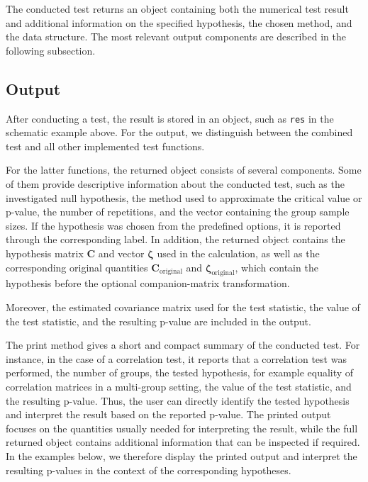 The conducted test returns an object containing both the numerical test result
and additional information on the specified hypothesis, the chosen method, and
the data structure. The most relevant output components are described in the
following subsection.

\subsection{Output}\label{output}

After conducting a test, the result is stored in an object, such as \texttt{res} in
the schematic example above. For the output, we distinguish between the
combined test and all other implemented test functions.

For the latter functions, the returned object consists of several components.
Some of them provide descriptive information about the conducted test, such as
the investigated null hypothesis, the method used to approximate the critical
value or p-value, the number of repetitions, and the vector containing the group
sample sizes. If the hypothesis was chosen from the predefined options, it is reported through the corresponding label. In addition, the returned object contains the hypothesis matrix \(\boldsymbol{C}\) and vector \(\boldsymbol{\zeta}\) used in the calculation, as well as the corresponding original quantities \(\boldsymbol{C}_{\mathrm{original}}\) and \(\boldsymbol{\zeta}_{\mathrm{original}}\), which contain the hypothesis before the optional companion-matrix transformation.

Moreover, the estimated covariance matrix used for the test statistic, the
value of the test statistic, and the resulting p-value are included in the
output.

The print method gives a short and compact summary of the conducted test. For
instance, in the case of a correlation test, it reports that a correlation test
was performed, the number of groups, the tested hypothesis, for example equality
of correlation matrices in a multi-group setting, the value of the test
statistic, and the resulting p-value. Thus, the user can directly identify the
tested hypothesis and interpret the result based on the reported p-value. The
printed output focuses on the quantities usually needed for interpreting the
result, while the full returned object contains additional information that can
be inspected if required. In the examples below, we therefore display the
printed output and interpret the resulting p-values in the context of the
corresponding hypotheses.

